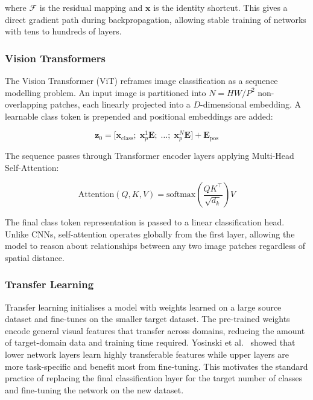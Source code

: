 \documentclass[12pt, letterpaper]{article}
\begin{document}
where $\mathcal{F}$ is the residual mapping and $\mathbf{x}$ is the identity shortcut.
This gives a direct gradient path during backpropagation, allowing stable training
of networks with tens to hundreds of layers.

\subsubsection{Vision Transformers}

The Vision Transformer (ViT) \cite{dosovitskiy2021vit} reframes image classification
as a sequence modelling problem. An input image is partitioned into $N = HW/P^2$
non-overlapping patches, each linearly projected into a $D$-dimensional embedding.
A learnable class token is prepended and positional embeddings are added:

\begin{equation}
    \mathbf{z}_0 = \bigl[\mathbf{x}_{\text{class}};\;
    \mathbf{x}_p^1 \mathbf{E};\; \ldots;\; \mathbf{x}_p^N \mathbf{E}\bigr]
    + \mathbf{E}_{\text{pos}}
    \label{eq:vit_input}
\end{equation}

The sequence passes through Transformer encoder layers applying Multi-Head
Self-Attention:

\begin{equation}
    \text{Attention}(Q, K, V) =
    \text{softmax}\!\left(\frac{QK^\top}{\sqrt{d_k}}\right) V
    \label{eq:attention}
\end{equation}

The final class token representation is passed to a linear classification head.
Unlike CNNs, self-attention operates globally from the first layer, allowing the model
to reason about relationships between any two image patches regardless of spatial
distance.

\subsubsection{Transfer Learning}

Transfer learning initialises a model with weights learned on a large source dataset
and fine-tunes on the smaller target dataset. The pre-trained weights encode general
visual features that transfer across domains, reducing the amount of target-domain
data and training time required. Yosinski et al.\ \cite{yosinski2014transferable}
showed that lower network layers learn highly transferable features while
upper layers are more task-specific and benefit most from fine-tuning. This motivates
the standard practice of replacing the final classification layer for the target
number of classes and fine-tuning the network on the new dataset.
\end{document}
